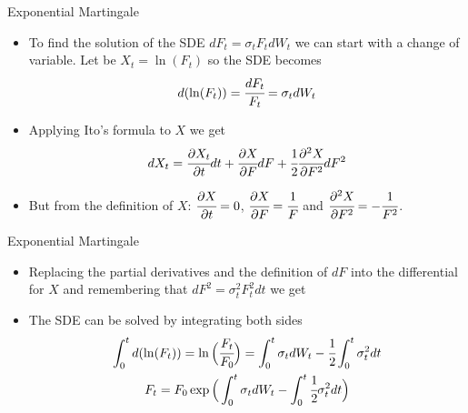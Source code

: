 \documentclass{beamer}
\begin{document}
\begin{frame}{Exponential Martingale}
 \begin{itemize}
	\item<1-> To find the solution of the SDE $dF_t = \sigma_tF_tdW_t$ we can start with a change of variable. Let be $X_t=\ln(F_t)$ so the SDE becomes
	\begin{equation*}
	d(\ln(F_t)) = \cfrac{dF_t}{F_t}=\sigma_tdW_t
   \end{equation*}
  \item<2-> Applying Ito's formula to $X$ we get
	\begin{equation*}
		dX_t = \cfrac{\partial X_t}{\partial t}dt + \cfrac{\partial X}{\partial F}dF + \cfrac{1}{2}\cfrac{\partial^2 X}{\partial F^2}dF^2
   \end{equation*}
	\item<3-> But from the definition of $X$: $\cfrac{\partial X}{\partial t}=0$, $\cfrac{\partial X}{\partial F}=\cfrac{1}{F}$ and $\cfrac{\partial^2 X}{\partial F^2}=-\cfrac{1}{F^2}$.
\end{itemize}
\end{frame}

\begin{frame}{Exponential Martingale}
 \begin{itemize}
	\item<1-> Replacing the partial derivatives and the definition of $dF$ into the differential for $X$ and remembering that $dF^2 = \sigma_t^2 F_t^2 dt$ we get
  \item<3-> The SDE can be solved by integrating both sides
	\begin{equation*}
	\begin{gathered}
	\int_0^t d(\ln(F_t)) = \ln\Big(\cfrac{F_t}{F_0}\Big)= \int_0^t \sigma_t dW_t - \cfrac{1}{2}\int_0^t\sigma_t^2 dt  \\
	F_t = F_0 \exp\Big(\int_0^t \sigma_t dW_t - \int_0^t\cfrac{1}{2}\sigma_t^2 dt\Big)  \\	
	\end{gathered}
	\end{equation*}
\end{itemize}
\end{frame}
\end{document}

